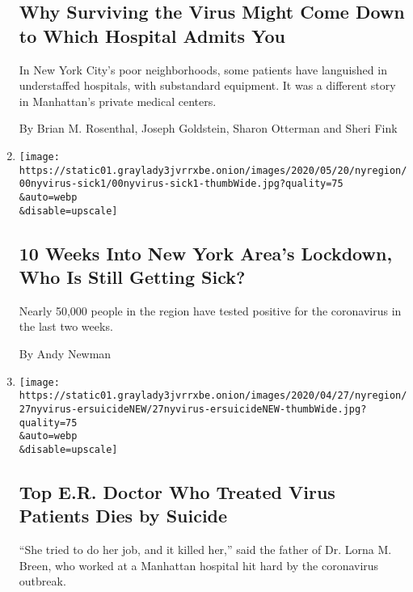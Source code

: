 \begin{enumerate}
{  \subsection{Why Surviving the Virus Might Come Down to Which Hospital
  Admits
  You}\label{why-surviving-the-virus-might-come-down-to-which-hospital-admits-you}}

  In New York City's poor neighborhoods, some patients have languished
  in understaffed hospitals, with substandard equipment. It was a
  different story in Manhattan's private medical centers.

  By Brian M. Rosenthal, Joseph Goldstein, Sharon Otterman and Sheri
  Fink
\item
  \href{/2020/05/28/nyregion/ny-coronavirus-new-cases.html}{}

  \texttt{[image: https://static01.graylady3jvrrxbe.onion/images/2020/05/20/nyregion/00nyvirus-sick1/00nyvirus-sick1-thumbWide.jpg?quality=75\\\&auto=webp\\\&disable=upscale]}

  \hypertarget{10-weeks-into-new-york-areas-lockdown-who-is-still-getting-sick}{%
  \subsection{10 Weeks Into New York Area's Lockdown, Who Is Still
  Getting
  Sick?}\label{10-weeks-into-new-york-areas-lockdown-who-is-still-getting-sick}}

  Nearly 50,000 people in the region have tested positive for the
  coronavirus in the last two weeks.

  By Andy Newman
\item
  \href{/2020/04/27/nyregion/new-york-city-doctor-suicide-coronavirus.html}{}

  \texttt{[image: https://static01.graylady3jvrrxbe.onion/images/2020/04/27/nyregion/27nyvirus-ersuicideNEW/27nyvirus-ersuicideNEW-thumbWide.jpg?quality=75\\\&auto=webp\\\&disable=upscale]}

  \hypertarget{top-er-doctor-who-treated-virus-patients-dies-by-suicide}{%
  \subsection{Top E.R. Doctor Who Treated Virus Patients Dies by
  Suicide}\label{top-er-doctor-who-treated-virus-patients-dies-by-suicide}}

  ``She tried to do her job, and it killed her,'' said the father of Dr.
  Lorna M. Breen, who worked at a Manhattan hospital hit hard by the
  coronavirus outbreak.


\end{enumerate}
